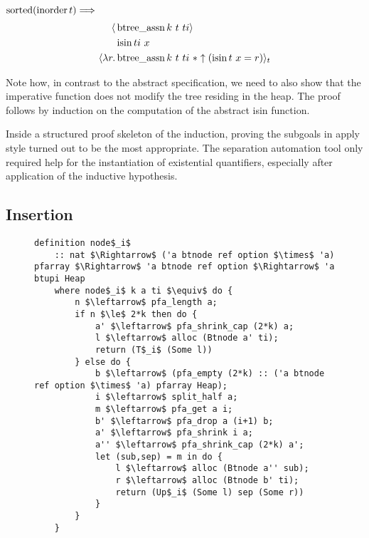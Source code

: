 \begin{lemma} $\operatorname{sorted} (\operatorname{inorder} t) \Longrightarrow$ \\
\begin{align*}
   \langle &\operatorname{btree\_assn} k\ t\ ti\rangle \\
           &\operatorname{isin} ti\ x \\
   \langle \lambda r. &\operatorname{btree\_assn} k\ t\ ti\ * \uparrow(\operatorname{isin} t\ x = r)\rangle_t
\end{align*}
\end{lemma}

Note how, in contrast to the abstract specification,
we need to also show that the imperative function does not modify the tree
residing in the heap.
The proof follows by induction on the computation of the abstract isin function.

Inside a structured proof skeleton of the induction,
proving the subgoals in apply style turned out to be the most
appropriate.
The separation automation tool only required help
for the instantiation of existential quantifiers,
especially after application of the inductive hypothesis. 

\subsection{Insertion}
\begin{figure}
\begin{lstlisting}[mathescape=true, language=Isabelle, label={lst:imp-nodei-fun},
    caption={The imperative node$_i$ function}]
definition node$_i$ 
    :: nat $\Rightarrow$ ('a btnode ref option $\times$ 'a) pfarray $\Rightarrow$ 'a btnode ref option $\Rightarrow$ 'a btupi Heap
    where node$_i$ k a ti $\equiv$ do {
        n $\leftarrow$ pfa_length a;
        if n $\le$ 2*k then do {
            a' $\leftarrow$ pfa_shrink_cap (2*k) a;
            l $\leftarrow$ alloc (Btnode a' ti);
            return (T$_i$ (Some l))
        } else do {
            b $\leftarrow$ (pfa_empty (2*k) :: ('a btnode ref option $\times$ 'a) pfarray Heap);
            i $\leftarrow$ split_half a;
            m $\leftarrow$ pfa_get a i;
            b' $\leftarrow$ pfa_drop a (i+1) b;
            a' $\leftarrow$ pfa_shrink i a; 
            a'' $\leftarrow$ pfa_shrink_cap (2*k) a';
            let (sub,sep) = m in do {
                l $\leftarrow$ alloc (Btnode a'' sub);
                r $\leftarrow$ alloc (Btnode b' ti);
                return (Up$_i$ (Some l) sep (Some r))
            }
        }
    }

\end{lstlisting}
\end{figure}

